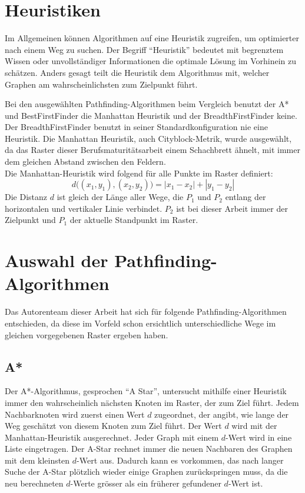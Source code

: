 
\section{Heuristiken}

Im Allgemeinen können Algorithmen auf eine Heuristik zugreifen, um
optimierter nach einem Weg zu suchen. Der Begriff ``Heuristik'' bedeutet
mit begrenztem Wissen oder unvollständiger Informationen die optimale
Lösung im Vorhinein zu schätzen. Anders gesagt teilt die Heuristik dem
Algorithmus mit, welcher Graphen am wahrscheinlichsten zum Zielpunkt führt.

Bei den ausgewählten Pathfinding-Algorithmen beim Vergleich benutzt der A* und
BestFirstFinder die Manhattan Heuristik und der BreadthFirstFinder
keine. Der BreadthFirstFinder benutzt in seiner Standardkonfiguration nie eine
Heuristik. Die Manhattan Heuristik, auch Cityblock-Metrik, wurde
ausgewählt, da das Raster dieser Berufsmaturitätsarbeit einem Schachbrett
ähnelt, mit immer dem gleichen Abstand zwischen den Feldern.\\
Die Manhattan-Heuristik wird folgend für alle Punkte im Raster definiert:
\begin{equation*}
d\big((x_1,y_1),(x_2,y_2)\big) = |x_1 - x_{2}| + |y_{1} - y_{2}|
\end{equation*}
Die Distanz $d$ ist gleich der Länge aller Wege, die $P_1$ und $P_2$ entlang der horizontalen und vertikaler Linie verbindet. $P_2$ ist bei dieser Arbeit immer der Zielpunkt und $P_1$ der
aktuelle Standpunkt im Raster. \cite[Patel, 2019]{heuristicsredblob}

\section{Auswahl der Pathfinding-Algorithmen}

Das Autorenteam dieser Arbeit hat sich für folgende Pathfinding-Algorithmen
entschieden, da diese im Vorfeld schon ersichtlich unterschiedliche
Wege im gleichen vorgegebenen Raster ergeben haben.

\subsection{A*}

Der A*-Algorithmus, gesprochen ``A Star'', untersucht mithilfe einer
Heuristik immer den wahrscheinlich nächsten Knoten im Raster, der zum
Ziel führt. Jedem Nachbarknoten wird zuerst einen Wert $d$ zugeordnet, der
angibt, wie lange der Weg geschätzt von diesem Knoten zum Ziel führt. Der Wert $d$
wird mit der Manhattan-Heuristik ausgerechnet. Jeder Graph mit einem $d$-Wert 
wird in eine Liste eingetragen. Der A-Star rechnet immer die neuen
Nachbaren des Graphen mit dem kleinsten $d$-Wert aus. Dadurch kann es
vorkommen, das nach langer Suche der A-Star plötzlich wieder einige
Graphen zurückspringen muss, da die neu berechneten $d$-Werte grösser als
ein früherer gefundener $d$-Wert ist.
\cite[Schmidt, Fuchs]{asterngeo}


